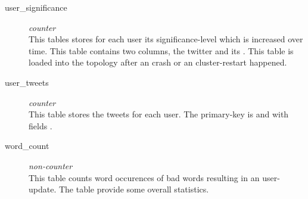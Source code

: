 \begin{description}
  \item[user\_significance] \textit{counter} \hfill \\
  This tables stores for each user its significance-level which is increased over time. This table contains two columns, the twitter  and its . This table is loaded into the topology after an crash or an cluster-restart happened.
  
  \item[user\_tweets] \textit{counter}  \hfill \\
  This table stores the tweets for each user. The primary-key is  and  with fields .
  
  \item[word\_count]  \textit{non-counter} \hfill \\
  This table counts word occurences of bad words resulting in an user-update. The table provide some overall statistics.
  
\end{description}
    
